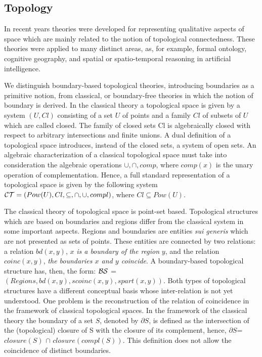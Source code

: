 \documentclass{ao2e}
\begin{document}
{\subsection{Topology}
In recent years theories were developed for representing qualitative aspects of space which are mainly related
to the notion of topological connectedness. These theories were applied
to many distinct areas, as, for example, formal ontology, cognitive geography, and
spatial or spatio-temporal reasoning in artificial intelligence.
 
We distinguish boundary-based topological theories, introducing boundaries as a primitive notion, from classical, or boundary-free theories in which the notion of boundary is derived. In the classical theory a topological space is given by a system $(U, Cl)$ consisting of a set $U$ of points and a family $Cl$ of subsets
of $U$which are called closed. The family of closed sets Cl is algebraically closed with respect to arbitrary intersections and finite unions. A dual definition of a topological space introduces, instead of the closed sets, a system of open sets.
An algebraic characterization of a classical topological space must take into consideration the algebraic
operations  $\cup, \cap, comp $, where $comp(x)$ is the unary operation of complementation. Hence, a full standard
representation of a topological space is given by the following system 
${\cal C T} = (Pow(U), Cl, \subseteq , \cap, \cup, compl)$, where $Cl \subseteq Pow(U)$.

The classical theory of
topological space is point-set based. Topological structures which are based on boundaries and regions differ from the classical system in some important aspects. Regions and boundaries are entities {\it sui generis} which are not presented as sets of points. These entities are connected by two relations: a relation $bd(x,y)$, $x$ \textit{is a boundary of the region} $y$, and the relation $coinc(x,y)$, {\it the boundaries $x$ and $y$ coincide}. A boundary-based topological structure has, then, the form: ${\cal B S}$ = $(Regions, bd(x,y), scoinc(x,y), spart(x,y))$.
Both types of topological structures have a different conceptual basis whose inter-relation is not yet understood. One problem is the reconstruction of the
relation of coincidence in the framework of classical topological spaces. In the framework of the classical theory
the boundary of a set $S$, denoted by $\partial$$S$, is defined as the intersection of the (topological) closure of S with the closure of its complement, hence, $\partial S $= $closure(S)$ $\cap$ $closure(compl(S))$. This definition does not allow the coincidence of distinct boundaries.

}
\end{document}
